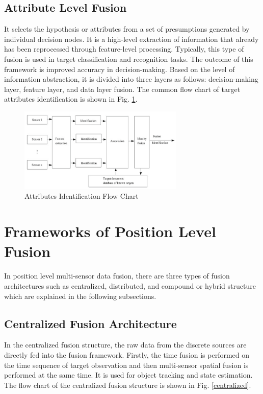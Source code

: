 \subsection{Attribute Level Fusion}
It selects the hypothesis or attributes from a set of presumptions generated by individual decision nodes. It is a high-level extraction of information that already has been reprocessed through feature-level processing. Typically, this type of fusion is used in target classification and recognition tasks. The outcome of this framework is improved accuracy in decision-making. Based on the level of information abstraction, it is divided into three layers as follows: decision-making layer, feature layer, and data layer fusion. The common flow chart of target attributes identification is shown in Fig. \ref{attributefusion}.

\begin{figure}
    \centering
    \includegraphics[width=0.7\textwidth]{Images/attributefusion.png}
    \caption{Attributes Identification Flow Chart \cite{yan}}
    \label{attributefusion}
\end{figure}

\section{Frameworks of Position Level Fusion}
In position level multi-sensor data fusion, there are three types of fusion architectures such as centralized, distributed, and compound or hybrid structure which are explained in the following subsections.

\subsection{Centralized Fusion Architecture}
In the centralized fusion structure, the raw data from the discrete sources are directly fed into the fusion framework. Firstly, the time fusion is performed on the time sequence of target observation and then multi-sensor spatial fusion is performed at the same time. It is used for object tracking and state estimation. The flow chart of the centralized fusion structure is shown in Fig. \ref{centralized}.  


